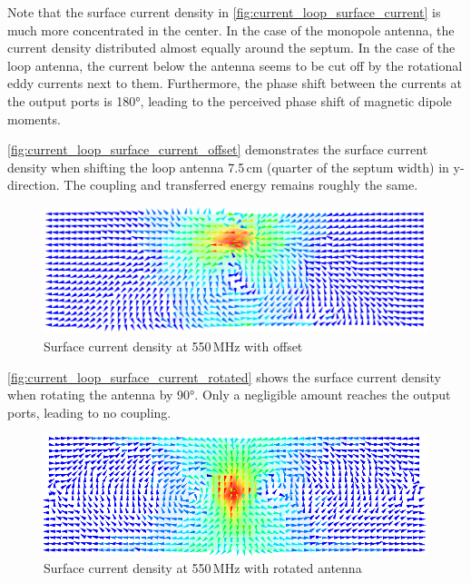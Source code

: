 Note that the surface current density in \autoref{fig:current_loop_surface_current} is much more concentrated in the center. In the case of the monopole antenna, the current density distributed almost equally around the septum. In the case of the loop antenna, the current below the antenna seems to be cut off by the rotational eddy currents next to them.  Furthermore, the phase shift between the currents at the output ports is 180°, leading to the perceived phase shift of magnetic dipole moments.

\autoref{fig:current_loop_surface_current_offset} demonstrates the surface current density when shifting the loop antenna 7.5\,cm (quarter of the septum width) in y-direction. The coupling and transferred energy remains roughly the same.

\begin{figure}[h]
    \centering
    \includegraphics[width=1\linewidth]{content//30_simulations//img/current_loop_surface_current_offset.png}
    \caption{Surface current density at 550\,MHz with offset}
    \label{fig:current_loop_surface_current_offset}
\end{figure}

\autoref{fig:current_loop_surface_current_rotated} shows the surface current density when rotating the antenna by 90°. Only a negligible amount reaches the output ports, leading to no coupling.  

\begin{figure}[h]
    \centering
    \includegraphics[width=1\linewidth]{content//30_simulations//img/current_loop_surface_current_rotated.png}
    \caption{Surface current density at 550\,MHz with rotated antenna}
    \label{fig:current_loop_surface_current_rotated}
\end{figure}

